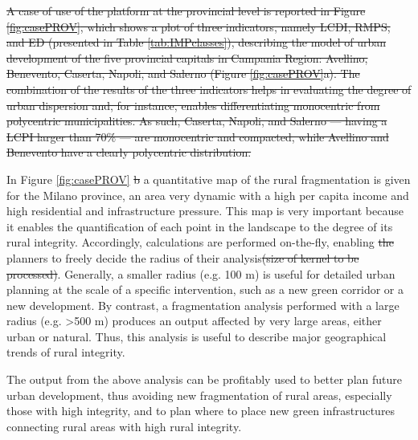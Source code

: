 \documentclass[APA,LATO1COL,doublespace]{WileyNJD-v2}
\providecommand{\DIFdeltex}[1]{{\protect\color{red}\sout{#1}}}                      %
\providecommand{\DIFdelbegin}{} %
\providecommand{\DIFdelend}{} %
\providecommand{\DIFdelFL}[1]{\DIFdel{#1}} %
\providecommand{\DIFdel}[1]{\texorpdfstring{\DIFdeltex{#1}}{}} %
\begin{document}
\DIFdelbegin \DIFdel{A case of use of the platform at the provincial level is reported in Figure \ref{fig:casePROV}, which shows a plot of three indicators, namely LCDI, RMPS, and ED (presented in Table \ref{tab:IMPclasses}), describing the model of urban development of the five provincial capitals in Campania Region: Avellino, Benevento, Caserta, Napoli, and Salerno (Figure \ref{fig:casePROV}a). 
The combination of the results of the three indicators helps in evaluating the degree of urban dispersion and, for instance, enables differentiating monocentric from polycentric municipalities. 
As such, Caserta, Napoli, and Salerno --- having a LCPI larger than 70\% --- are monocentric and compacted, while Avellino and Benevento have a clearly polycentric distribution.
}%


\DIFdelend In Figure \ref{fig:casePROV} \DIFdelbegin \DIFdel{b }\DIFdelend a quantitative map of the rural fragmentation is given for the Milano province, an area very dynamic with a high per capita income and high residential and infrastructure pressure. 
This map is very important because it enables the quantification of each point in the landscape to the degree of its rural integrity. 
Accordingly, calculations are performed on-the-fly, enabling \DIFdelbegin \DIFdel{the }\DIFdelend planners to freely decide the radius of their analysis\DIFdelbegin \DIFdel{(size of kernel to be processed)}\DIFdelend .
Generally, a smaller radius (e.g. 100 m) is useful for detailed urban planning at the scale of a specific intervention, such as a new green corridor or a new development.
By contrast, a fragmentation analysis performed with a large radius (e.g. >500 m) produces an output affected by very large areas, either urban or natural. 
Thus, this analysis is useful to describe major geographical trends of rural integrity.
\DIFdelbegin %

\DIFdelend The output from the above analysis can be profitably used to better plan future urban development, thus avoiding new fragmentation of rural areas, especially those with high integrity, and to plan where to place new green infrastructures connecting rural areas with high rural integrity.
\end{document}
